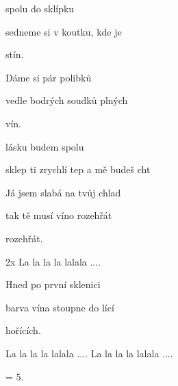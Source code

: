 

\zs
{} spolu do sklípku

sedneme si v koutku, kde je 

 stín.
\ks

\zs
Dáme si pár polibků

vedle bodrých soudků plných 

 vín.
\ks

\zr
{} lásku budem spolu  ~ 

 sklep ti zrychlí tep a  mě budeš cht
\kr

\zs
Já jsem slabá na tvůj chlad

tak tě musí víno rozehřát

rozehřát.
\ks

2x
\zs
La la la la lalala ....
\ks

\zr
\kr

\zs
Hned po první sklenici

barva vína stoupne do lící

hořících.
\ks

\zs
La la la la lalala ....
\ks
\zs
La la la la lalala ....
\ks

\zr
\kr

\zs
= 5.
\ks

\kp